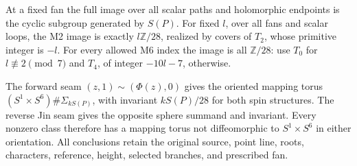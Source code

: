 \begin{theorem}
At a fixed fan the full image over all scalar paths and holomorphic
endpoints is the cyclic subgroup generated by \(S(P)\).
For fixed \(l\), over all fans and scalar loops, the M2 image is
exactly \(l\mathbb Z/28\), realized by covers of \(T_2\), whose
primitive integer is \(-l\). For every allowed M6 index the image
is all \(\mathbb Z/28\): use \(T_0\) for \(l\not\equiv2\pmod7\)
and \(T_4\), of integer \(-10l-7\), otherwise.

The forward seam \((z,1)\sim(\Phi(z),0)\) gives the oriented
mapping torus \((S^1\times S^6)\#\Sigma_{kS(P)}\), with invariant
\(kS(P)/28\) for both spin structures. The reverse Jin seam gives
the opposite sphere summand and invariant. Every nonzero class
therefore has a mapping torus not diffeomorphic to
\(S^1\times S^6\) in either orientation. All conclusions retain
the original source, point line, roots, characters, reference,
height, selected branches, and prescribed fan.
\end{theorem}

